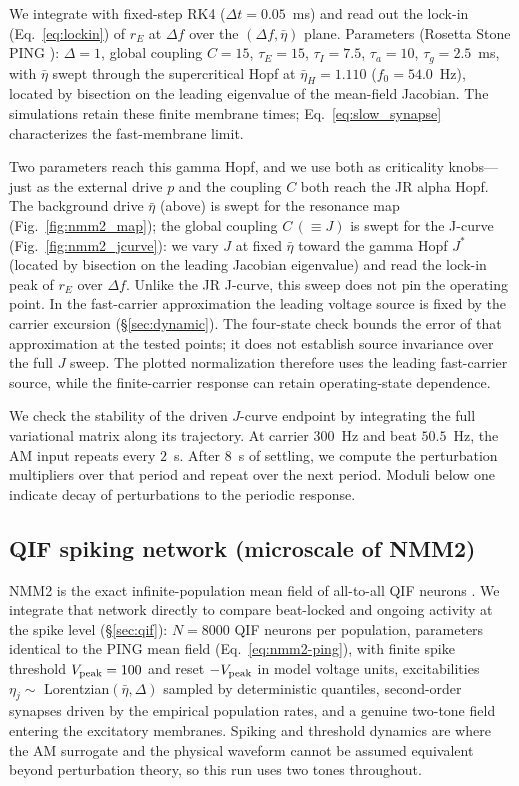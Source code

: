 \documentclass[11pt,a4paper]{article}
\begin{document}
We integrate with fixed-step RK4 ($\Delta t=0.05$~ms) and read out the lock-in
(Eq.~\eqref{eq:lockin}) of $r_E$ at $\Delta f$ over the $(\Delta f, \bar\eta)$ plane.
Parameters (Rosetta Stone PING \cite{ruffini2025rosetta}): $\Delta=1$, global coupling
$C=15$, $\tau_E=15$, $\tau_I=7.5$, $\tau_a=10$, $\tau_g=2.5$~ms, with $\bar\eta$ swept
through the supercritical Hopf at $\bar\eta_H=1.110$ ($f_0=54.0$~Hz), located by bisection
on the leading eigenvalue of the mean-field Jacobian. The simulations retain these
finite membrane times; Eq.~\eqref{eq:slow_synapse} characterizes the fast-membrane limit.

Two parameters reach this gamma Hopf, and we use both as criticality knobs---just as the
external drive $p$ and the coupling $C$ both reach the JR alpha Hopf. The background drive
$\bar\eta$ (above) is swept for the resonance map (Fig.~\ref{fig:nmm2_map}); the global
coupling $C\,(\equiv J)$ is swept for the J-curve (Fig.~\ref{fig:nmm2_jcurve}): we vary
$J$ at fixed $\bar\eta$ toward the gamma Hopf $J^*$ (located by bisection on the leading
Jacobian eigenvalue) and read the lock-in peak of $r_E$ over $\Delta f$. Unlike the JR
J-curve, this sweep does not pin the operating point. In the fast-carrier
approximation the leading voltage source is fixed by the carrier excursion
(\S\ref{sec:dynamic}). The four-state check bounds the error of that approximation
at the tested points; it does not establish source invariance over the full $J$
sweep. The plotted normalization therefore uses the leading fast-carrier source,
while the finite-carrier response can retain operating-state dependence.

We check the stability of the driven $J$-curve endpoint by integrating the full
variational matrix along its trajectory. At carrier $300$~Hz and beat $50.5$~Hz,
the AM input repeats every $2$~s. After $8$~s of settling, we compute the
perturbation multipliers over that period and repeat over the next period.
Moduli below one indicate decay of perturbations to the periodic response.

\subsection{QIF spiking network (microscale of NMM2)}\label{sec:qif-methods}
NMM2 is the exact infinite-population mean field of all-to-all QIF neurons
\cite{montbrio2015,ruffini2025rosetta,clusella2023}. We integrate that network directly
to compare beat-locked and ongoing activity at the spike level (\S\ref{sec:qif}): $N=8000$ QIF neurons per
population, parameters identical to the PING mean field (Eq.~\eqref{eq:nmm2-ping}),
with finite spike threshold $V_{\rm peak}=100$ and reset $-V_{\rm peak}$ in model
voltage units, excitabilities $\eta_j\sim$ Lorentzian$(\bar\eta,\Delta)$ sampled by deterministic
quantiles, second-order synapses driven by the empirical population rates, and a genuine
two-tone field entering the excitatory membranes. Spiking and threshold dynamics are
where the AM surrogate and the physical waveform cannot be assumed equivalent beyond
perturbation theory, so this run uses two tones throughout.
\end{document}
